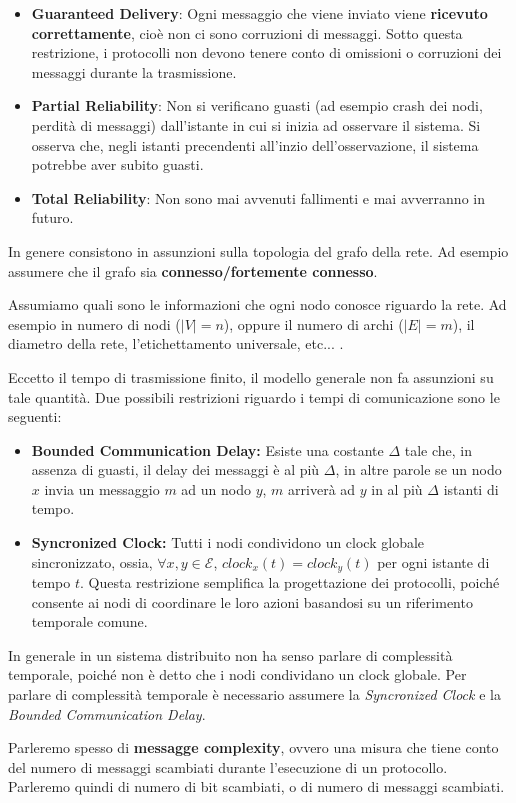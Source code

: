 \begin{description}
    \begin{itemize}
        \item \textbf{Guaranteed Delivery}: Ogni messaggio che viene inviato viene \textbf{ricevuto correttamente}, cioè non ci sono corruzioni di messaggi. Sotto questa restrizione, i protocolli non devono tenere conto di omissioni o corruzioni dei messaggi durante la trasmissione.
        \item \textbf{Partial Reliability}: Non si verificano guasti (ad esempio crash dei nodi, perdità di messaggi) dall'istante in cui si inizia ad osservare il sistema. Si osserva che, negli istanti precendenti all'inzio dell'osservazione, il sistema potrebbe aver subito guasti.
        \item \textbf{Total Reliability}: Non sono mai avvenuti fallimenti e mai avverranno in futuro.
    \end{itemize}
    \item[Topological Restrictions] In genere consistono in assunzioni sulla topologia del grafo della rete. Ad esempio assumere che il grafo sia \textbf{connesso/fortemente connesso}.
    \item[Knowledge Restrictions] Assumiamo quali sono le informazioni che ogni nodo conosce riguardo la rete. Ad esempio in numero di nodi ($|V| = n$), oppure il numero di archi ($|E| = m$), il diametro della rete, l'etichettamento universale, etc... .
    \item[Time Restrictions] Eccetto il tempo di trasmissione finito, il modello generale non fa assunzioni su tale quantità.
    Due possibili restrizioni riguardo i tempi di comunicazione sono le seguenti:
    \begin{itemize}
        \item \textbf{Bounded Communication Delay:} Esiste una costante $\Delta$ tale che, in assenza di guasti, il delay dei messaggi è al più $\Delta$, in altre parole se un nodo $x$ invia un messaggio $m$ ad un nodo $y$, $m$ arriverà ad $y$ in al più $\Delta$ istanti di tempo.
        \item \textbf{Syncronized Clock:} Tutti i nodi condividono un clock globale sincronizzato, ossia, $\forall x, y \in \mathcal{E}$, $clock_x(t) = clock_y(t)$ per ogni istante di tempo $t$. Questa restrizione semplifica la progettazione dei protocolli, poiché consente ai nodi di coordinare le loro azioni basandosi su un riferimento temporale comune.
    \end{itemize}
    \item[Cost \& Complexity Measures] In generale in un sistema distribuito non ha senso parlare di complessità temporale, poiché non è detto che i nodi condividano un clock globale. Per parlare di complessità temporale è necessario assumere la \textit{Syncronized Clock} e la \textit{Bounded Communication Delay}. 
    
    Parleremo spesso di \textbf{messagge complexity}, ovvero una misura che tiene conto del numero di messaggi scambiati durante l'esecuzione di un protocollo. Parleremo quindi di numero di bit scambiati, o di numero di messaggi scambiati.
\end{description}
